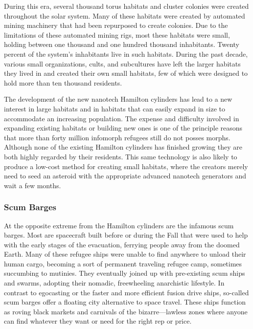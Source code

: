 During this era, several thousand torus habitats 
and cluster colonies were created throughout the solar 
system. Many of these habitats were created by automated
mining machinery that had been repurposed
to create colonies. Due to the limitations of these automated
mining rigs, most these habitats were small,
holding between one thousand and one hundred 
thousand inhabitants. Twenty percent of the system's 
inhabitants live in such habitats. During the past 
decade, various small organizations, cults, and subcultures
have left the larger habitats they lived in and
created their own small habitats, few of which were 
designed to hold more than ten thousand residents.

The development of the new nanotech Hamilton 
cylinders has lead to a new interest in large habitats
and in habitats that can easily expand in size
to accommodate an increasing population. The expense
and difficulty involved in expanding existing
habitats or building new ones is one of the principle 
reasons that more than forty million infomorph 
refugees still do not posses morphs. Although none 
of the existing Hamilton cylinders has finished growing
they are both highly regarded by their residents.
This same technology is also likely to produce a 
low-cost method for creating small habitats, where 
the creators merely need to seed an asteroid with the 
appropriate advanced nanotech generators and wait 
a few months.

\subsubsection{Scum Barges}

At the opposite extreme from the Hamilton cylinders 
are the infamous scum barges. Most are spacecraft 
built before or during the Fall that were used to 
help with the early stages of the evacuation, ferrying 
people away from the doomed Earth. Many of these 
refugee ships were unable to find anywhere to unload 
their human cargo, becoming a sort of permanent 
traveling refugee camp, sometimes succumbing to 
mutinies. They eventually joined up with pre-existing 
scum ships and swarms, adopting their nomadic, freewheeling
anarchistic lifestyle. In contrast to egocasting
or the faster and more efficient fusion drive ships,
so-called scum barges offer a floating city alternative 
to space travel. These ships function as roving black 
markets and carnivals of the bizarre—lawless zones 
where anyone can find whatever they want or need for 
the right rep or price.

